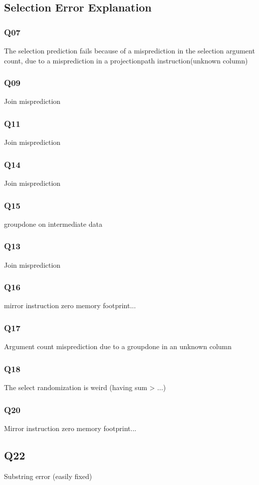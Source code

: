 \subsection{Selection Error Explanation}

\subsubsection{Q07}
The selection prediction fails because of a misprediction in the selection
argument count, due to a misprediction in a projectionpath instruction(unknown column)
\subsubsection{Q09}
Join misprediction
\subsubsection{Q11}
Join misprediction
\subsubsection{Q14}
Join misprediction
\subsubsection{Q15}
groupdone on intermediate data
\subsubsection{Q13}
Join misprediction
\subsubsection{Q16}
mirror instruction zero memory footprint...
\subsubsection{Q17}
Argument count misprediction due to a groupdone in an unknown column
\subsubsection{Q18}
The select randomization is weird (having sum > ...)
\subsubsection{Q20}
Mirror instruction zero memory footprint...
\subsection{Q22}
Substring error (easily fixed)

